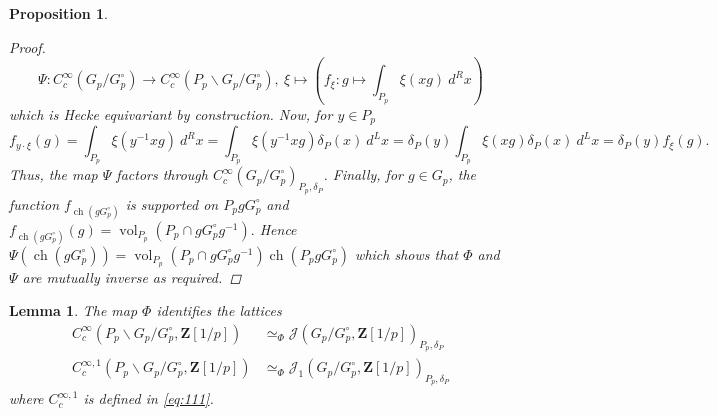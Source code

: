 \documentclass[10pt,a4paper]{amsart}
\newtheorem{prop}{Proposition}
\newtheorem{lem}{Lemma}
\DeclareMathOperator{\ch}{ch}
\DeclareMathOperator{\vol}{vol}
\begin{document}
\begin{prop}
\begin{proof}
        $$\Psi: C_c^\infty(G_p/G_p^\circ)\longrightarrow C_c^\infty(P_p\backslash G_p/G_p^\circ),\ \xi\mapsto \left(f_\xi:g\mapsto \int_{P_p}\xi(xg)\ d^Rx\right)$$
        which is Hecke equivariant by construction. Now, for $y\in P_p$ $$f_{y\cdot\xi}(g)=\int_{P_p}\xi(y^{-1}xg)\ d^Rx=\int_{P_p}\xi(y^{-1}xg)\delta_P(x)\ d^Lx=\delta_P(y)\int_{P_p}\xi(xg)\delta_P(x)\ d^Lx=\delta_P(y)f_\xi(g).$$
        Thus, the map $\Psi$ factors through $C_c^\infty(G_p/G_p^\circ)_{P_p,\delta_P}$. Finally, for $g\in G_p$, the function $f_{\ch(gG_p^\circ)}$ is supported on $P_pg G_p^\circ$ and 
        $f_{\ch(gG_p^\circ)}(g)=\vol_{P_p}\left(P_p\cap g G_p^\circ g^{-1}\right).$ Hence $\Psi(\ch(gG_p^\circ))=\vol_{P_p}\left(P_p\cap g G_p^\circ g^{-1}\right)\ch(P_pgG_p^\circ)$ which shows that $\Phi$ and $\Psi$ are mutually inverse as required.
    \end{proof}
\end{prop}

\begin{lem}\label{lem identification of lattices}
    The map $\Phi$ identifies the lattices 
    \begin{align*}C_c^\infty(P_p\backslash G_p/G_p^\circ,\mathbf{Z}[1/p])&\simeq_{\Phi} \mathcal{J}(G_p/G_p^\circ,\mathbf{Z}[1/p])_{P_p,\delta_P}\\
    C_c^{\infty,1}(P_p\backslash G_p/G_p^\circ,\mathbf{Z}[1/p])&\simeq_{\Phi} \mathcal{J}_1(G_p/G_p^\circ,\mathbf{Z}[1/p])_{P_p,\delta_P}
    \end{align*}
    where $C_c^{\infty,1}$ is defined in \eqref{eq:111}.
\end{lem}
\end{document}
